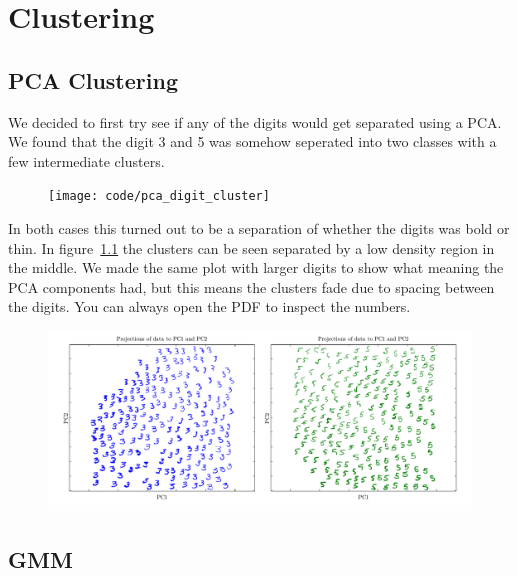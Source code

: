 \chapter{Clustering}


\section{PCA Clustering}
We decided to first try see if any of the digits would get separated using a PCA. We found that the digit 3 and 5 was somehow seperated into two classes with a few intermediate clusters.

\begin{figure}[H]
\centering
\texttt{[image: code/pca\_digit\_cluster]}
\caption{}
\label{fig:pca_cluster}
\end{figure}

In both cases this turned out to be a separation of whether the digits was bold or thin. In figure~\ref{fig:pca_cluster} the clusters can be seen separated by a low density region in the middle. We made the same plot with larger digits to show what meaning the PCA components had, but this means the clusters fade due to spacing between the digits. You can always open the PDF to inspect the numbers.

\begin{figure}[H]
\centering
\includegraphics[width=1\linewidth]{code/pca_digit_cluster_z}
\caption{}
\label{fig:pca_cluster_zoom}
\end{figure}

\section{GMM}

